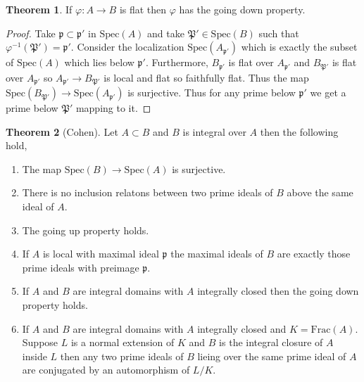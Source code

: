 \documentclass[12pt]{article}
\newcommand{\Frac}[1]{\mathrm{Frac}\left(#1\right)}
\newcommand{\spec}[1]{\mathrm{Spec}\left( #1 \right)}
\newcommand{\p}{\mathfrak{p}}
\theoremstyle{remark}
\theoremstyle{definition}
\newtheorem{theorem}{Theorem}[section]
\begin{document}
\begin{theorem}
If $\varphi : A \to B$ is flat then $\varphi$ has the going down property. 
\end{theorem}

\begin{proof}
Take $\p \subset \p'$ in $\spec{A}$ and take $\mathfrak{P}' \in \spec{B}$ such that $\varphi^{-1}(\mathfrak{P}') = \p'$. Consider the localization $\spec{A_{\p'}}$ which is exactly the subset of $\spec{A}$ which lies below $\p'$. Furthermore, $B_{\p'}$ is flat over $A_{\p'}$ and $B_{\mathfrak{P}'}$ is flat over $A_{\p'}$ so $A_{\p'} \to B_{\mathfrak{P}'}$ is local and flat so faithfully flat. Thus the map $\spec{B_{\mathfrak{P}'}} \to \spec{A_{\p'}}$ is surjective. Thus for any prime below $\p'$ we get a prime below $\mathfrak{P}'$ mapping to it. 
\end{proof}

\begin{theorem}[Cohen]
Let $A \subset B$ and $B$ is integral over $A$ then the following hold,
\begin{enumerate}
\item The map $\spec{B} \to \spec{A}$ is surjective.
\item There is no inclusion relatons between two prime ideals of $B$ above the same ideal of $A$. 
\item The going up property holds. 
\item If $A$ is local with maximal ideal $\p$ the maximal ideals of $B$ are exactly those prime ideals with preimage $\p$. 
\item If $A$ and $B$ are integral domains with $A$ integrally closed then the going down property holds.  
\item If $A$ and $B$ are integral domains with $A$ integrally closed and $K = \Frac{A}$. Suppose $L$ is a normal extension of $K$ and $B$ is the integral closure of $A$ inside $L$ then any two prime ideals of $B$ lieing over the same prime ideal of $A$ are conjugated by an automorphism of $L / K$.  
\end{enumerate}
\end{theorem}
\end{document}
